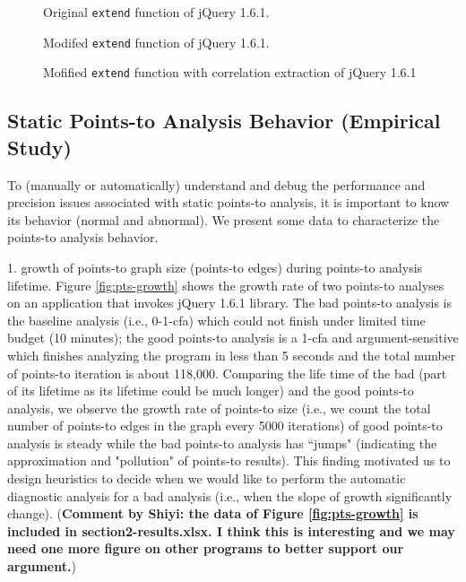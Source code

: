 \documentclass[a4paper,UKenglish]{lipics}
\begin{document}
\begin{figure}[th!]
        
\caption{\textmd{Original {\tt extend} function of jQuery 1.6.1.}}
\label{fig:jquery-orig}
\end{figure}

\begin{figure}[th!]
        
\caption{\textmd{Modifed {\tt extend} function of jQuery 1.6.1.}}
\label{fig:jquery-modified}
\end{figure}

\begin{figure}[th!]
        
\caption{\textmd{Mofified {\tt extend} function with correlation extraction \cite{} of jQuery 1.6.1}}
\label{fig:jquery-extracted}
\end{figure}

\subsection{Static Points-to Analysis Behavior (Empirical Study)}
To (manually or automatically) understand and debug the performance and precision issues associated with static points-to analysis, it is important to know its behavior (normal and abnormal). We present some data to characterize the points-to analysis behavior.

1. growth of points-to graph size (points-to edges) during points-to analysis lifetime. Figure \ref{fig:pts-growth} shows the growth rate of two points-to analyses on an application that invokes jQuery 1.6.1 library. The bad points-to analysis is the baseline analysis (i.e., 0-1-cfa) which could not finish under limited time budget (10 minutes); the good points-to analysis is a 1-cfa and argument-sensitive which finishes analyzing the program in less than 5 seconds and the total number of points-to iteration is about 118,000. Comparing the life time of the bad (part of its lifetime as its lifetime could be much longer) and the good points-to analysis, we observe the growth rate of points-to size (i.e., we count the total number of points-to edges in the graph every 5000 iterations) of good points-to analysis is steady while the bad points-to analysis has ``jumps" (indicating the approximation and "pollution" of points-to results). This finding motivated us to design heuristics to decide when we would like to perform the automatic diagnostic analysis for a bad analysis (i.e., when the slope of growth significantly change). ({\bf Comment by Shiyi: the data of Figure \ref{fig:pts-growth} is included in section2-results.xlsx. I think this is interesting and we may need one more figure on other programs to better support our argument.})
\end{document}
